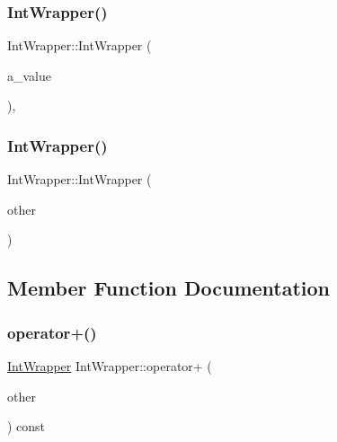 \mbox{\label{class_int_wrapper_a1d35e0d0b9c0fc109a8d2a2118ae6010}} 
\subsubsection{\texorpdfstring{IntWrapper()}{IntWrapper()}\hspace{0.1cm}{\footnotesize\ttfamily [5/6]}}
{\footnotesize\ttfamily Int\+Wrapper\+::\+Int\+Wrapper (\begin{DoxyParamCaption}\item[{int}]{a\+\_\+value }\end{DoxyParamCaption})\hspace{0.3cm}{\ttfamily [inline]}, {\ttfamily [explicit]}}

\mbox{\label{class_int_wrapper_af23efe3c8d8bf176948922b41e8f253e}} 
\subsubsection{\texorpdfstring{IntWrapper()}{IntWrapper()}\hspace{0.1cm}{\footnotesize\ttfamily [6/6]}}
{\footnotesize\ttfamily Int\+Wrapper\+::\+Int\+Wrapper (\begin{DoxyParamCaption}\item[{const \mbox{\hyperlink{class_int_wrapper}{Int\+Wrapper}} \&}]{other }\end{DoxyParamCaption})\hspace{0.3cm}{\ttfamily [inline]}}



\subsection{Member Function Documentation}
\mbox{\label{class_int_wrapper_abf97bd11dd2825f3cb9e4d9f48152b56}} 
\subsubsection{\texorpdfstring{operator+()}{operator+()}\hspace{0.1cm}{\footnotesize\ttfamily [1/3]}}
{\footnotesize\ttfamily \mbox{\hyperlink{class_int_wrapper}{Int\+Wrapper}} Int\+Wrapper\+::operator+ (\begin{DoxyParamCaption}\item[{int}]{other }\end{DoxyParamCaption}) const\hspace{0.3cm}{\ttfamily [inline]}}

